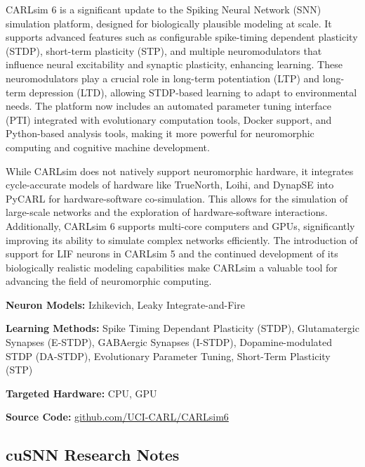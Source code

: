 CARLsim 6 is a significant update to the Spiking Neural Network (SNN) simulation platform, designed for biologically plausible modeling at scale. It supports advanced features such as configurable spike-timing dependent plasticity (STDP), short-term plasticity (STP), and multiple neuromodulators that influence neural excitability and synaptic plasticity, enhancing learning. These neuromodulators play a crucial role in long-term potentiation (LTP) and long-term depression (LTD), allowing STDP-based learning to adapt to environmental needs. The platform now includes an automated parameter tuning interface (PTI) integrated with evolutionary computation tools, Docker support, and Python-based analysis tools, making it more powerful for neuromorphic computing and cognitive machine development.

While CARLsim does not natively support neuromorphic hardware, it integrates cycle-accurate models of hardware like TrueNorth, Loihi, and DynapSE into PyCARL for hardware-software co-simulation. This allows for the simulation of large-scale networks and the exploration of hardware-software interactions. Additionally, CARLsim 6 supports multi-core computers and GPUs, significantly improving its ability to simulate complex networks efficiently. The introduction of support for LIF neurons in CARLsim 5 and the continued development of its biologically realistic modeling capabilities make CARLsim a valuable tool for advancing the field of neuromorphic computing.

\begin{tcolorbox}[enhanced,attach boxed title to top center={yshift=-3mm,yshifttext=-1mm}, colback=blue!5!white,colframe=blue!75!black,colbacktitle=red!80!black, title=CARLsim at a Glance,fonttitle=\bfseries, boxed title style={size=small,colframe=red!50!black} ]

\textbf{Neuron Models:} Izhikevich, Leaky Integrate-and-Fire

\textbf{Learning Methods:} Spike Timing Dependant Plasticity (STDP), Glutamatergic Synapses (E-STDP), GABAergic Synapses (I-STDP), Dopamine-modulated STDP (DA-STDP), Evolutionary Parameter Tuning, Short-Term Plasticity (STP)  

\textbf{Targeted Hardware:} CPU, GPU 

\textbf{Source Code:} \href{https://github.com/UCI-CARL/CARLsim6}{github.com/UCI-CARL/CARLsim6}
\end{tcolorbox}
\subsection*{cuSNN Research Notes}\label{cuSNN}

